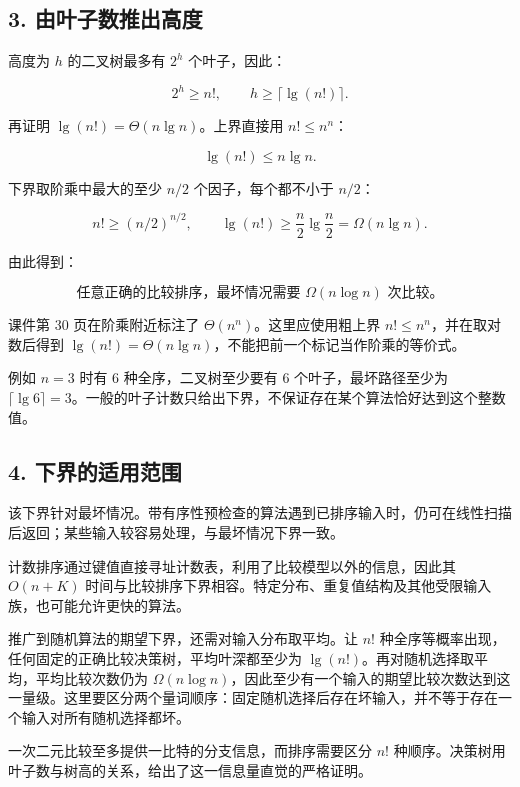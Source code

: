 \documentclass[
  UTF8,fontset=none,zihao=5]{ctexart}
\let\OldSubsection\subsection
\renewcommand{\subsection}{\Needspace{4\baselineskip}\OldSubsection}
\begin{document}
\hypertarget{ux7531ux53f6ux5b50ux6570ux63a8ux51faux9ad8ux5ea6}{%
\subsection{3.
由叶子数推出高度}\label{ux7531ux53f6ux5b50ux6570ux63a8ux51faux9ad8ux5ea6}}

高度为 \(h\) 的二叉树最多有 \(2^h\) 个叶子，因此：

\[
2^h\ge n!,
\qquad
h\ge\lceil\lg(n!)\rceil.
\]

再证明 \(\lg(n!)=\Theta(n\lg n)\)。上界直接用 \(n!\le n^n\)：

\[
\lg(n!)\le n\lg n.
\]

下界取阶乘中最大的至少 \(n/2\) 个因子，每个都不小于 \(n/2\)：

\[
n!\ge (n/2)^{n/2},
\qquad
\lg(n!)\ge\frac n2\lg\frac n2=\Omega(n\lg n).
\]

由此得到：

\[
\boxed{\text{任意正确的比较排序，最坏情况需要 }
\Omega(n\log n)\text{ 次比较。}}
\]

课件第 30 页在阶乘附近标注了 \(\Theta(n^n)\)。这里应使用粗上界
\(n!\le n^n\)，并在取对数后得到
\(\lg(n!)=\Theta(n\lg n)\)，不能把前一个标记当作阶乘的等价式。

例如 \(n=3\) 时有 6 种全序，二叉树至少要有 6 个叶子，最坏路径至少为
\(\lceil\lg6\rceil=3\)。一般的叶子计数只给出下界，不保证存在某个算法恰好达到这个整数值。

\hypertarget{ux4e0bux754cux7684ux9002ux7528ux8303ux56f4}{%
\subsection{4.
下界的适用范围}\label{ux4e0bux754cux7684ux9002ux7528ux8303ux56f4}}

该下界针对最坏情况。带有序性预检查的算法遇到已排序输入时，仍可在线性扫描后返回；某些输入较容易处理，与最坏情况下界一致。

计数排序通过键值直接寻址计数表，利用了比较模型以外的信息，因此其
\(O(n+K)\)
时间与比较排序下界相容。特定分布、重复值结构及其他受限输入族，也可能允许更快的算法。

推广到随机算法的期望下界，还需对输入分布取平均。让 \(n!\)
种全序等概率出现，任何固定的正确比较决策树，平均叶深都至少为
\(\lg(n!)\)。再对随机选择取平均，平均比较次数仍为
\(\Omega(n\log n)\)，因此至少有一个输入的期望比较次数达到这一量级。这里要区分两个量词顺序：固定随机选择后存在坏输入，并不等于存在一个输入对所有随机选择都坏。

一次二元比较至多提供一比特的分支信息，而排序需要区分 \(n!\)
种顺序。决策树用叶子数与树高的关系，给出了这一信息量直觉的严格证明。
\end{document}
